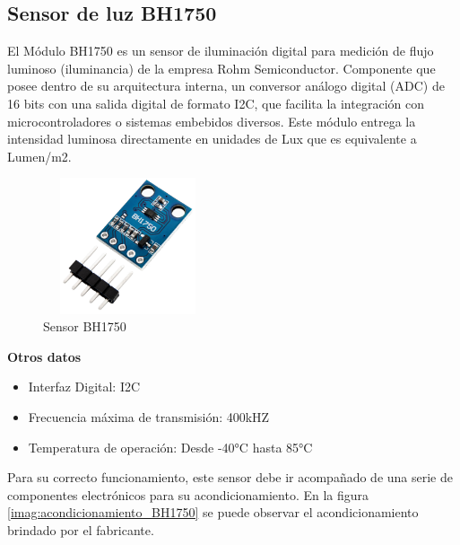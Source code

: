 \vspace{0.5cm}

\subsection{Sensor de luz BH1750}

El Módulo BH1750 es un sensor de iluminación digital para medición de flujo luminoso (iluminancia) de la empresa Rohm Semiconductor. Componente que posee dentro de su arquitectura interna, un conversor análogo digital (ADC) de 16 bits con una salida digital de formato I2C, que facilita la integración con microcontroladores o sistemas embebidos diversos. Este módulo entrega la intensidad luminosa directamente en unidades de Lux que es equivalente a Lumen/m2.\\

\begin{figure}[H]
    \centering
    \includegraphics[width=5cm, height=4cm]{imagenes/Sensor BH1750.jpg}
    \caption{Sensor BH1750}
    \label{imag:BH1750}
 \end{figure}

\textbf{Otros datos}

\begin{itemize}
    \item Interfaz Digital: I2C
    \item Frecuencia máxima de transmisión: 400kHZ
    \item Temperatura de operación: Desde -40°C hasta 85°C
\end{itemize}

Para su correcto funcionamiento, este sensor debe ir acompañado de una serie de componentes electrónicos para su acondicionamiento.
En la figura \ref{imag:acondicionamiento_BH1750} se puede observar el acondicionamiento brindado por el fabricante.

